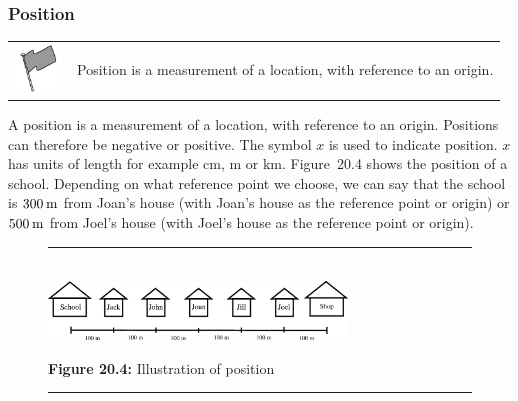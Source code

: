             \subsubsection{ Position}
            \nopagebreak
\par
            \label{m38787*fhsst!!!underscore!!!id107}\begin{definition}
	  \begin{tabular*}{15 cm}{m{15 mm}m{}}
	\hspace*{-50pt}  \includegraphics[width=0.5in]{col11305.imgs/psflag2.png}   & \Definition{   \label{id2526538}\textbf{ Position }} { \label{m38787*meaningfhsst!!!underscore!!!id107}
        \label{m38787*id62726}Position is a measurement of a location, with reference to an origin. \par 
         } 
      \end{tabular*}
      \end{definition}
        \label{m38787*id62737}A position is a measurement of a location, with reference to an origin. Positions can therefore be negative or positive. The symbol $x$ is used to indicate position. $x$ has units of length for example cm, m or km.
Figure~20.4 shows the position of a school. Depending on what reference point we choose, we can say that the school is $300\phantom{\rule{2pt}{0ex}}\mathrm{m}$ from Joan's house (with Joan's house as the reference point or origin) or  $500\phantom{\rule{2pt}{0ex}}\mathrm{m}$ from Joel's house (with Joel's house as the reference point or origin).\par 
    \setcounter{subfigure}{0}
	\begin{figure}[H] %
    \begin{center}
    \rule[.1in]{\figurerulewidth}{.005in} \\
        \label{m38787*uid7!!!underscore!!!media}\label{m38787*uid7!!!underscore!!!printimage}\includegraphics[width=300px]{col11305.imgs/m38787_PG10C2_003.png} %
      \vspace{2pt}
    \vspace{\rubberspace}\par \begin{cnxcaption}
	  \small \textbf{Figure 20.4: }Illustration of position
	\end{cnxcaption}
    \vspace{.1in}
    \rule[.1in]{\figurerulewidth}{.005in} \\
    \end{center}
 \end{figure}       
